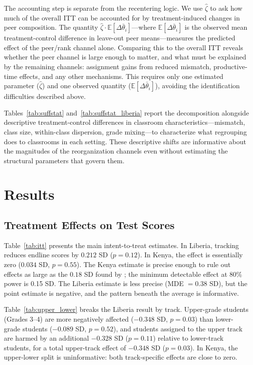 \documentclass[11pt]{article}
\newcommand{\E}{\mathbb{E}}
\begin{document}
The accounting step is separate from the recentering logic. We use $\hat{\zeta}$ to ask how much of the overall ITT can be accounted for by treatment-induced changes in peer composition. The quantity $\hat{\zeta} \cdot \E[\Delta\bar{\theta}_i]$---where $\E[\Delta\bar{\theta}_i]$ is the observed mean treatment-control difference in leave-out peer means---measures the predicted effect of the peer/rank channel alone. Comparing this to the overall ITT reveals whether the peer channel is large enough to matter, and what must be explained by the remaining channels: assignment gains from reduced mismatch, productive-time effects, and any other mechanisms. This requires only one estimated parameter ($\hat{\zeta}$) and one observed quantity ($\E[\Delta\bar{\theta}_i]$), avoiding the identification difficulties described above.

Tables~\ref{tab:suffstat} and~\ref{tab:suffstat_liberia} report the decomposition alongside descriptive treatment-control differences in classroom characteristics---mismatch, class size, within-class dispersion, grade mixing---to characterize what regrouping does to classrooms in each setting. These descriptive shifts are informative about the magnitudes of the reorganization channels even without estimating the structural parameters that govern them.

\section{Results}
\label{sec:results}

\subsection{Treatment Effects on Test Scores}

Table~\ref{tab:itt} presents the main intent-to-treat estimates. In Liberia, tracking reduces endline scores by $0.212$ SD ($p = 0.12$). In Kenya, the effect is essentially zero ($0.034$ SD, $p = 0.55$). The Kenya estimate is precise enough to rule out effects as large as the $0.18$ SD found by \citet{duflo2011peer}; the minimum detectable effect at 80\% power is 0.15 SD. The Liberia estimate is less precise (MDE $= 0.38$ SD), but the point estimate is negative, and the pattern beneath the average is informative.

Table~\ref{tab:upper_lower} breaks the Liberia result by track. Upper-grade students (Grades 3--4) are more negatively affected ($-0.348$ SD, $p = 0.03$) than lower-grade students ($-0.089$ SD, $p = 0.52$), and students assigned to the upper track are harmed by an additional $-0.328$ SD ($p = 0.11$) relative to lower-track students, for a total upper-track effect of $-0.348$ SD ($p = 0.03$). In Kenya, the upper-lower split is uninformative: both track-specific effects are close to zero.
\end{document}
